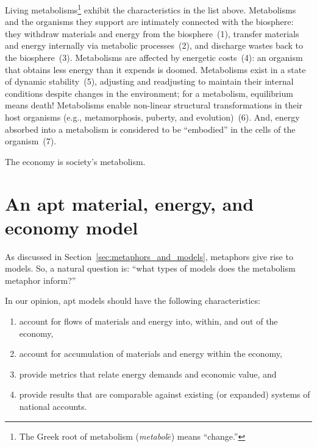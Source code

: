 Living metabolisms\footnote{The 
	Greek root of metabolism 
	(\emph{metabol$\bar{e}$}) means ``change.''}
exhibit the characteristics in the list above.
Metabolisms and the organisms they support
are intimately connected with the biosphere:
they withdraw materials and energy from the biosphere~(1), 
transfer materials and energy internally via metabolic processes~(2), 
and discharge wastes back to the biosphere~(3).
Metabolisms are affected by energetic costs~(4): 
an organism that obtains less energy than it expends is doomed.
Metabolisms exist in a state of dynamic stability~(5),
adjusting and readjusting to maintain their internal conditions
despite changes in the environment; 
for a metabolism, equilibrium means death!
Metabolisms enable non-linear structural transformations
in their host organisms (e.g., metamorphosis, puberty, and evolution)~(6).
And, energy absorbed into a metabolism is considered to be ``embodied''
in the cells of the organism~(7).

The economy is society's metabolism.\cite{F-K1998, Giampietro2000, Giampietro2013}


\section{An apt material, energy, and economy model}
\label{sec:apt_models}

As discussed in Section~\ref{sec:metaphors_and_models}, 
metaphors give rise to models.
So, a natural question is: 
``what types of models does the metabolism metaphor inform?''

In our opinion, apt models should have the following characteristics:

\begin{enumerate}
	\item{account for flows of materials and energy into, within, and out of the economy,}
	\item{account for accumulation of materials and energy within the economy,}
	\item{provide metrics that relate energy demands and economic value, and}
	\item{provide results that are comparable against existing 
			(or expanded) systems of national accounts.}
\end{enumerate}

